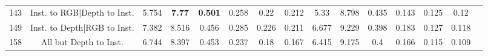 \begin{table}
\begin{tabular}{@{\hskip3pt}c@{\hskip3pt}c@{\hskip3pt}c@{\hskip3pt}c@{\hskip3pt}c@{\hskip3pt}c@{\hskip3pt}c@{\hskip3pt}c@{\hskip3pt}c@{\hskip3pt}c@{\hskip3pt}c@{\hskip3pt}c@{\hskip3pt}c@{\hskip3pt}c@{\hskip3pt}c}
                                          143 &         Inst. to RGB|Depth to Inst. &             5.754 &  \textbf{7.77} &  \textbf{0.501} &           0.258 &            0.22 &           0.212 &                5.33 &         8.798 &           0.435 &           0.143 &           0.125 &            0.12 \\
                                          149 &         Inst. to Depth|RGB to Inst. &             7.382 &          8.516 &           0.456 &           0.285 &           0.226 &           0.211 &               6.677 &         9.229 &           0.398 &           0.183 &           0.127 &           0.118 \\
                                          158 &              All but Depth to Inst. &             6.744 &          8.397 &           0.453 &           0.237 &            0.18 &           0.167 &               6.415 &         9.175 &             0.4 &           0.166 &           0.115 &           0.109 \\
\bottomrule
\end{tabular}
\end{table}

